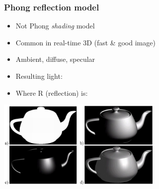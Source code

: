\documentclass{beamer}
\begin{document}
\begin{frame}\frametitle{Phong reflection model}

\begin{itemize}
\item
  Not Phong \emph{shading} model
\item
  Common in real-time 3D (fast \& good image)
\item
  Ambient, diffuse, specular
\item
  Resulting light: 
\item
  Where R (reflection) is: 
\end{itemize}

\begin{center}
\includegraphics[width=0.6\textwidth]{ads.jpg}
\end{center}

\end{frame}
\end{document}
